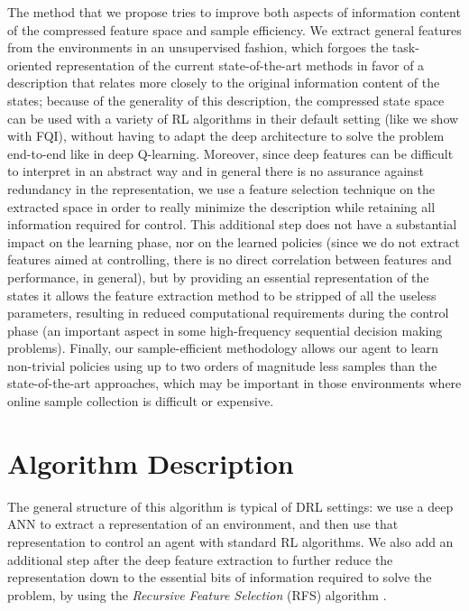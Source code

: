 The method that we propose tries to improve both aspects of information content
of the compressed feature space and sample efficiency. We extract general 
features from the environments in an unsupervised fashion, which forgoes the
task-oriented representation of the current state-of-the-art methods in favor of
a description that relates more closely to the original information content of 
the states; because of the generality of this description, the compressed state 
space can be used with a variety of RL algorithms in their default setting (like
we show with FQI), without having to adapt the deep architecture to solve the 
problem end-to-end like in deep Q-learning.
Moreover, since deep features can be difficult to interpret in an abstract 
way and in general there is no assurance against redundancy in the 
representation, we use a feature selection technique on the extracted space in 
order to really minimize the description while retaining all information 
required for control. 
This additional step does not have a substantial impact on the learning phase, 
nor on the learned policies (since we do not extract features aimed at 
controlling, there is no direct correlation between features and performance, in
general), but by providing an essential representation of the states it allows
the feature extraction method to be stripped of all the useless parameters, 
resulting in reduced computational requirements during the control phase (an 
important aspect in some high-frequency sequential decision making problems).
Finally, our sample-efficient methodology allows our agent to learn non-trivial 
policies using up to two orders of magnitude less samples than the 
state-of-the-art approaches, which may be important in those environments where 
online sample collection is difficult or expensive.

\section{Algorithm Description} \label{s:main_alg}
The general structure of this algorithm is typical of DRL settings: we use a 
deep ANN to extract a representation of an environment, and then use that 
representation to control an agent with standard RL algorithms. We also add an 
additional step after the deep feature extraction to further reduce the 
representation down to the essential bits of information required to solve the 
problem, by using the \textit{Recursive Feature Selection} (RFS) algorithm 
\cite{castelletti2011tree}.

